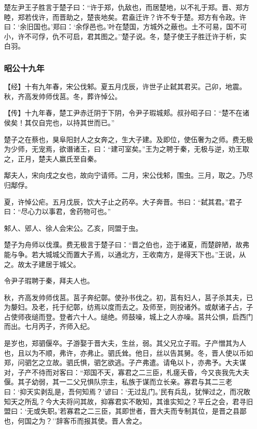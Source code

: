 \documentclass[]{article}
\begin{document}
楚左尹王子胜言于楚子曰：``许于郑，仇敌也，而居楚地，以不礼于郑。晋、郑方睦，郑若伐许，而晋助之，楚丧地矣。君盍迁许？许不专于楚。郑方有令政。许曰：`余旧国也。'郑曰：`余俘邑也。'叶在楚国，方城外之蔽也。土不可易，国不可小，许不可俘，仇不可启，君其图之。''楚子说。冬，楚子使王子胜迁许于析，实白羽。

\hypertarget{header-n2671}{%
\subsubsection{昭公十九年}\label{header-n2671}}

【经】十有九年春，宋公伐邾。夏五月戊辰，许世子止弑其君买。己卯，地震。秋，齐高发帅师伐莒。冬，葬许悼公。

【传】十九年春，楚工尹赤迁阴于下阴，令尹子瑕城郏。叔孙昭子曰：``楚不在诸侯矣！其仅自完也，以持其世而已。''

楚子之在蔡也，狊阜阳封人之女奔之，生大子建。及即位，使伍奢为之师。费无极为少师，无宠焉，欲谮诸王，曰：``建可室矣。''王为之聘于秦，无极与逆，劝王取之，正月，楚夫人嬴氏至自秦。

鄅夫人，宋向戌之女也，故向宁请师。二月，宋公伐邾，围虫。三月，取之。乃尽归鄅俘。

夏，许悼公疟。五月戊辰，饮大子止之药卒。大子奔晋。书曰：``弑其君。''君子曰：``尽心力以事君，舍药物可也。''

邾人、郳人、徐人会宋公。乙亥，同盟于虫。

楚子为舟师以伐濮。费无极言于楚子曰：``晋之伯也，迩于诸夏，而楚辟陋，故弗能与争。若大城城父而置大子焉，以通北方，王收南方，是得天下也。''王说，从之。故太子建居于城父。

令尹子瑕聘于秦，拜夫人也。

秋，齐高发帅师伐莒。莒子奔纪鄣。使孙书伐之。初，莒有妇人，莒子杀其夫，已为嫠妇。及老，托于纪鄣，纺焉以度而去之。及师至，则投诸外。或献诸子占，子占使师夜缒而登。登者六十人。缒绝。师鼓噪，城上之人亦噪。莒共公惧，启西门而出。七月丙子，齐师入纪。

是岁也，郑驷偃卒。子游娶于晋大夫，生丝，弱。其父兄立子瑕。子产憎其为人也，且以为不顺，弗许，亦弗止。驷氏耸。他日，丝以告其舅。冬，晋人使以币如郑，问驷乞之立故。驷氏惧，驷乞欲逃。子产弗遣。请龟以卜，亦弗予。大夫谋对，子产不待而对客曰：``郑国不天，寡君之二三臣，札瘥夭昏，今又丧我先大夫偃。其子幼弱，其一二父兄惧队宗主，私族于谋而立长亲。寡君与其二三老曰：`抑天实剥乱是，吾何知焉？'谚曰：`无过乱门。'民有兵乱，犹惮过之，而况敢知天之所乱？今大夫将问其故，抑寡君实不敢知，其谁实知之？平丘之会，君寻旧盟曰：`无或失职。'若寡君之二三臣，其即世者，晋大夫而专制其位，是晋之县鄙也，何国之为？''辞客币而报其使。晋人舍之。
\end{document}

